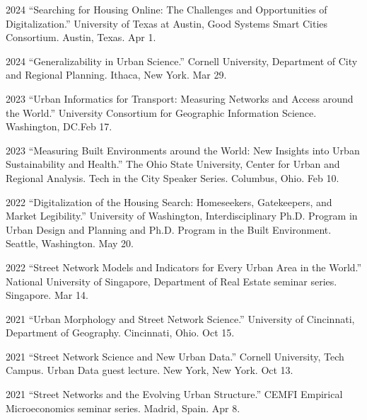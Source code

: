 \documentclass[11pt,letterpaper]{report}
\begin{document}
    \begin{tablist}

        \item[2024] \tab{}\enquote{Searching for Housing Online: The Challenges and Opportunities of Digitalization.} University of Texas at Austin, Good Systems Smart Cities Consortium. Austin, Texas. Apr 1.

        \item[2024] \tab{}\enquote{Generalizability in Urban Science.} Cornell University, Department of City and Regional Planning. Ithaca, New York. Mar 29.

        \item[2023] \tab{}\enquote{Urban Informatics for Transport: Measuring Networks and Access around the World.} University Consortium for Geographic Information Science. Washington, DC.\@ Feb 17.

        \item[2023] \tab{}\enquote{Measuring Built Environments around the World: New Insights into Urban Sustainability and Health.} The Ohio State University, Center for Urban and Regional Analysis. Tech in the City Speaker Series. Columbus, Ohio. Feb 10.

        \item[2022] \tab{}\enquote{Digitalization of the Housing Search: Homeseekers, Gatekeepers, and Market Legibility.} University of Washington, Interdisciplinary Ph.D. Program in Urban Design and Planning and Ph.D. Program in the Built Environment. Seattle, Washington. May 20.

        \item[2022] \tab{}\enquote{Street Network Models and Indicators for Every Urban Area in the World.} National University of Singapore, Department of Real Estate seminar series. Singapore. Mar 14.

        \item[2021] \tab{}\enquote{Urban Morphology and Street Network Science.} University of Cincinnati, Department of Geography. Cincinnati, Ohio. Oct 15.

        \item[2021] \tab{}\enquote{Street Network Science and New Urban Data.} Cornell University, Tech Campus. Urban Data guest lecture. New York, New York. Oct 13.

        \item[2021] \tab{}\enquote{Street Networks and the Evolving Urban Structure.} CEMFI Empirical Microeconomics seminar series. Madrid, Spain. Apr 8.


\end{tablist}
\end{document}
